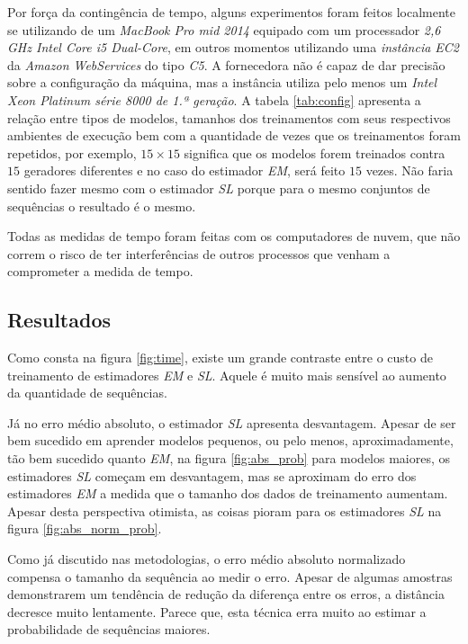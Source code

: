 \documentclass{subfiles}
\begin{document}
Por força da contingência de tempo, alguns experimentos foram feitos localmente se utilizando de um \textit{MacBook Pro mid 2014} equipado com um processador \textit{2,6 GHz Intel Core i5 Dual-Core}, em outros momentos utilizando uma \textit{instância EC2} da \textit{Amazon WebServices} do tipo \textit{C5}. A fornecedora não é capaz de dar precisão sobre a configuração da máquina, mas a instância utiliza pelo menos um \textit{Intel Xeon Platinum série 8000 de 1.ª geração}\autocite{AWS:2023EC2}. A tabela \ref{tab:config} apresenta a relação entre tipos de modelos, tamanhos dos treinamentos com seus respectivos ambientes de execução bem com a quantidade de vezes que os treinamentos foram repetidos, por exemplo, $15 \times 15$ significa que os modelos forem treinados contra $15$ geradores diferentes e no caso do estimador \textit{EM}, será feito $15$ vezes. Não faria sentido fazer mesmo com o estimador \textit{SL} porque para o mesmo conjuntos de sequências o resultado é o mesmo.

Todas as medidas de tempo foram feitas com os computadores de nuvem, que não correm o risco de ter interferências de outros processos que venham a comprometer a medida de tempo.

\subsection{Resultados}

Como consta na figura \ref{fig:time}, existe um grande contraste entre o custo de treinamento de estimadores \textit{EM} e \textit{SL}. Aquele é muito mais sensível ao aumento da quantidade de sequências.

Já no erro médio absoluto, o estimador \textit{SL} apresenta desvantagem. Apesar de ser bem sucedido em aprender modelos pequenos, ou pelo menos, aproximadamente, tão bem sucedido quanto \textit{EM}, na figura \ref{fig:abs_prob} para modelos maiores, os estimadores \textit{SL} começam em desvantagem, mas se aproximam do erro dos estimadores \textit{EM} a medida que o tamanho dos dados de treinamento aumentam. Apesar desta perspectiva otimista, as coisas pioram para os estimadores \textit{SL} na figura \ref{fig:abs_norm_prob}.

Como já discutido nas metodologias, o erro médio absoluto normalizado compensa o tamanho da sequência ao medir o erro. Apesar de algumas amostras demonstrarem um tendência de redução da diferença entre os erros, a distância decresce muito lentamente. Parece que, esta técnica erra muito ao estimar a probabilidade de sequências maiores.
\end{document}
